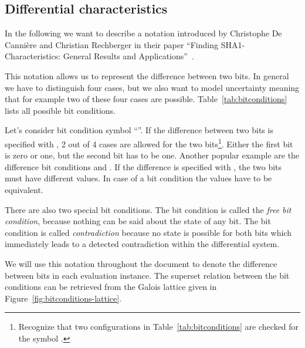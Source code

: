 \subsection{Differential characteristics}
\label{sec:differential-characteristic}
%
In the following we want to describe a notation introduced by Christophe De Cannière and Christian Rechberger in their paper ``Finding SHA1-Characteristics: General Results and Applications''~\cite{Cry01}.

This notation allows us to represent the difference between two bits. In general we have to distinguish four cases, but we also want to model uncertainty meaning that for example two of these four cases are possible. Table~\ref{tab:bitconditions} lists all possible bit conditions.

Let's consider bit condition symbol ``''. If the difference between two bits is specified with , 2 out of 4 cases are allowed for the two bits\footnote{Recognize that two configurations in Table~\ref{tab:bitconditions} are checked for the symbol .}. Either the first bit is zero or one, but the second bit has to be one. Another popular example are the difference bit conditions  and \bc{\textendash}. If the difference is specified with , the two bits must have different values. In case of a bit condition \bc{\textendash} the values have to be equivalent.

There are also two special bit conditions. The bit condition  is called the \emph{free bit condition}, because nothing can be said about the state of any bit. The bit condition \bc{\#} is called \emph{contradiction} because no state is possible for both bits which immediately leads to a detected contradiction within the differential system.

We will use this notation throughout the document to denote the difference between bits in each evaluation instance. The superset relation between the bit conditions can be retrieved from the Galois lattice given in Figure~\ref{fig:bitconditions-lattice}.

